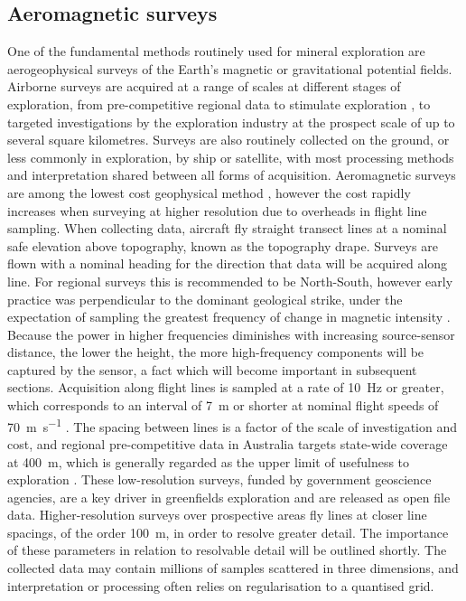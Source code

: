 \documentclass[manuscript.tex]{subfiles}
\begin{document}
\subsection{Aeromagnetic surveys}
One of the fundamental methods routinely used for mineral exploration are aerogeophysical surveys of the Earth's magnetic or gravitational potential fields.
Airborne surveys are acquired at a range of scales at different stages of exploration, from pre-competitive regional data to stimulate exploration \parencite{howardAirborneGeophysicalCoverage2004}, to targeted investigations by the exploration industry at the prospect scale of up to several square kilometres.
Surveys are also routinely collected on the ground, or less commonly in exploration, by ship or satellite, with most processing methods and interpretation shared between all forms of acquisition.
Aeromagnetic surveys are among the lowest cost geophysical method \parencite{dentithGeophysicsMineralExploration2014}, however the cost rapidly increases when surveying at higher resolution due to overheads in flight line sampling.
When collecting data, aircraft fly straight transect lines at a nominal safe elevation above topography, known as the topography drape.
Surveys are flown with a nominal heading for the direction that data will be acquired along line.
For regional surveys this is recommended to be North-South, however early practice was perpendicular to the dominant geological strike, under the expectation of sampling the greatest frequency of change in magnetic intensity \parencite{islesGeologicalInterpretationAeromagnetic2018}.
Because the power in higher frequencies diminishes with increasing source-sensor distance, the lower the height, the more high-frequency components will be captured by the sensor, a fact which will become important in subsequent sections.
Acquisition along flight lines is sampled at a rate of \qty{10}{\hertz} or greater, which corresponds to an interval of \qty{7}{\m} or shorter at nominal flight speeds of \qty{70}{\m\per\s} \parencite{goodwinAirborneMagneticRadiometric2023}.
The spacing between lines is a factor of the scale of investigation and cost, and regional pre-competitive data in Australia targets state-wide coverage at \qty{400}{\m}, which is generally regarded as the upper limit of usefulness to exploration \parencite{howardAirborneGeophysicalCoverage2004}.
These low-resolution surveys, funded by government geoscience agencies, are a key driver in greenfields exploration and are released as open file data.
Higher-resolution surveys over prospective areas fly lines at closer line spacings, of the order \qty{100}{\m}, in order to resolve greater detail.
The importance of these parameters in relation to resolvable detail will be outlined shortly.
The collected data may contain millions of samples scattered in three dimensions, and interpretation or processing often relies on regularisation to a quantised grid.
\end{document}
